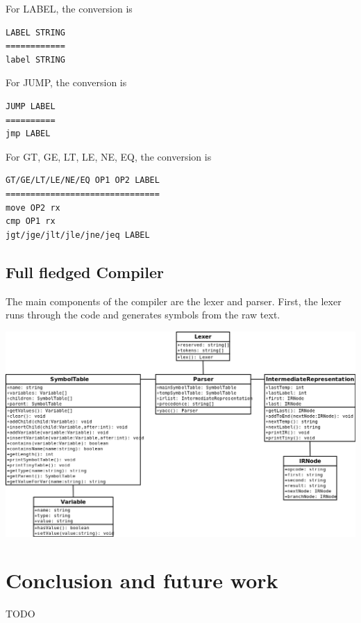 \documentclass[12pt]{article}
\begin{document}
            For LABEL, the conversion is
            \begin{verbatim}
LABEL STRING
============
label STRING
            \end{verbatim}

            For JUMP, the conversion is
            \begin{verbatim}
JUMP LABEL
==========
jmp LABEL
            \end{verbatim}

            For GT, GE, LT, LE, NE, EQ, the conversion is
            \begin{verbatim}
GT/GE/LT/LE/NE/EQ OP1 OP2 LABEL
===============================
move OP2 rx
cmp OP1 rx
jgt/jge/jlt/jle/jne/jeq LABEL
            \end{verbatim}

    	\subsection{Full fledged Compiler}
            The main components of the compiler are the lexer and parser.
            First, the lexer runs through the code and generates symbols from the raw text.
            \begin{center}
                \includegraphics[width=\linewidth]{uml}
            \end{center}

    \section{Conclusion and future work}	
			TODO	    
    
 
\end{document}

